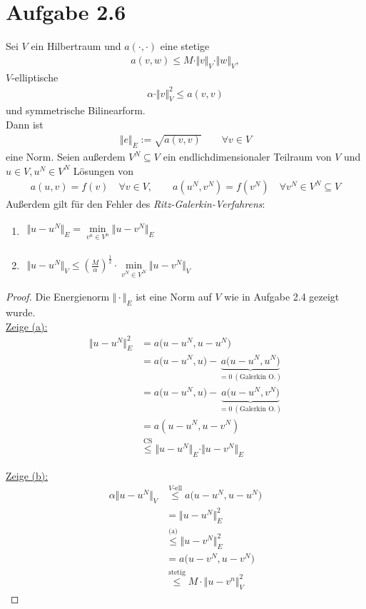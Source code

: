 \documentclass[12pt,a4paper]{article}
\begin{document}
\section*{Aufgabe 2.6}
Sei $V$ ein Hilbertraum und  $a(\cdot,\cdot)$ eine stetige
\begin{align*}
a(v,w)\leq M\cdot\Vert v\Vert_V\cdot\Vert w\Vert_V,
\end{align*}
$V$-elliptische
\begin{align*}
\alpha\cdot\Vert v\Vert^2_V\leq a(v,v)
\end{align*}
und symmetrische Bilinearform.\\
Dann ist
\begin{align*}
\Vert e\Vert_E:=\sqrt{a(v,v)}\qquad\forall v\in V
\end{align*}
eine Norm. Seien außerdem $V^N\subseteq V$ ein endlichdimensionaler Teilraum von $V$ und $u\in V,u^N\in V^N$ Lösungen von
\begin{align*}
a(u,v)=f(v)\quad\forall v\in V,\qquad a(u^N,v^N)=f(v^N)\quad\forall v^N\in V^N\subseteq V
\end{align*}
Außerdem gilt für den Fehler des \textit{Ritz-Galerkin-Verfahrens}:
\begin{enumerate}[label=(\alph*)]
\item $\begin{aligned}
\Vert u-u^N\Vert_E=\min\limits_{v^n\in V^n}\Vert u-v^N\Vert_E
\end{aligned}$
\item $\begin{aligned}
\Vert u-u^N\Vert_V\leq\left(\frac{M}{\alpha}\right)^{\frac{1}{2}}\cdot\min\limits_{v^N\in V^N}\Vert u-v^N\Vert_V
\end{aligned}$
\end{enumerate}
\begin{proof}
Die Energienorm $\Vert\cdot\Vert_E$ ist eine Norm auf $V$ wie in Aufgabe 2.4 gezeigt wurde.\\

\underline{Zeige (a):}
\begin{align*}
\Vert u-u^N\Vert_E^2
&=a\big(u-u^N,u-u^N\big) \\
&=a\big(u-u^N,u\big) - \underbrace{a\big(u-u^N,u^N\big)}_{=0~(\text{Galerkin O.})} \\
&=a\big(u-u^N,u\big) - \underbrace{a\big(u-u^N,v^N\big)}_{=0~(\text{Galerkin O.})} \\
&=a(u-u^N,u-v^N)\\
&\stackrel{\text{CS}}{\leq}
\Vert u-u^N\Vert_E\cdot\Vert u-v^N\Vert_E
\end{align*}

\underline{Zeige (b):}
\begin{align*}
\alpha\Vert u-u^N\Vert_V
&\stackrel{V\text{-ell}}{\leq}
a\big(u-u^N,u-u^N\big)\\
&=\big\Vert u-u^N\big\Vert^2_E\\
&\stackrel{\text{(a)}}{\leq}
\big\Vert u-v^N\big\Vert^2_E\\
&=a\big(u-v^N,u-v^N\big)\\
&\stackrel{\text{stetig}}{\leq}
M\cdot\big\Vert u-v^n\big\Vert^2_V
\end{align*}
\end{proof}
\end{document}
